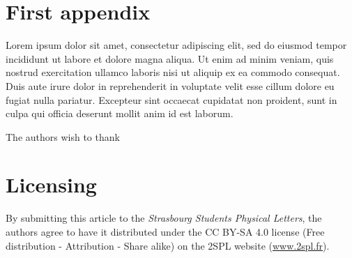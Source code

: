 \documentclass[
 reprint,
 preprintnumbers,
 nobibnotes,
 nofootinbib,
 longbibliography,
 amsmath,amssymb,
 aps,pra
]{revtex4-2}
\begin{document}
\appendix


\section{First appendix}
\label{app:lorem_appendix}

Lorem ipsum dolor sit amet, consectetur adipiscing elit, sed do eiusmod tempor incididunt ut labore et dolore magna aliqua. Ut enim ad minim veniam, quis nostrud exercitation ullamco laboris nisi ut aliquip ex ea commodo consequat. Duis aute irure dolor in reprehenderit in voluptate velit esse cillum dolore eu fugiat nulla pariatur. Excepteur sint occaecat cupidatat non proident, sunt in culpa qui officia deserunt mollit anim id est laborum.


\begin{acknowledgments}
    The authors wish to thank
\end{acknowledgments}


\section*{Licensing}

By submitting this article to the {\em Strasbourg Students Physical Letters}, the authors agree to have it distributed under the CC BY-SA 4.0 license (Free distribution - Attribution - Share alike) on the 2SPL website (\url{www.2spl.fr}).


\end{document}
